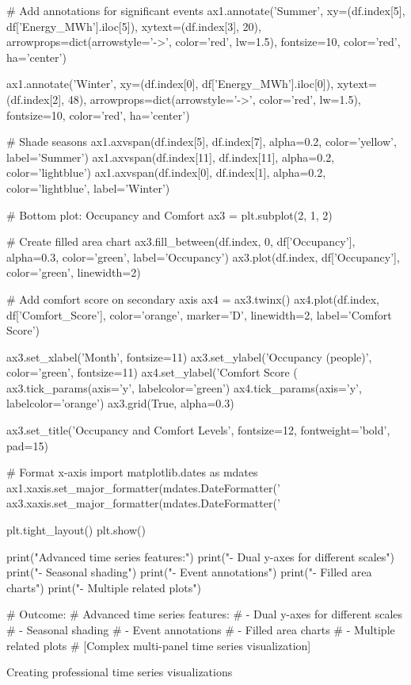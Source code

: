 {    # Add annotations for significant events
    ax1.annotate('Summer\nMinimum', 
                xy=(df.index[5], df['Energy_MWh'].iloc[5]),
                xytext=(df.index[3], 20),
                arrowprops=dict(arrowstyle='->', color='red', lw=1.5),
                fontsize=10, color='red', ha='center')
    
    ax1.annotate('Winter\nPeak', 
                xy=(df.index[0], df['Energy_MWh'].iloc[0]),
                xytext=(df.index[2], 48),
                arrowprops=dict(arrowstyle='->', color='red', lw=1.5),
                fontsize=10, color='red', ha='center')
    
    # Shade seasons
    ax1.axvspan(df.index[5], df.index[7], alpha=0.2, color='yellow', label='Summer')
    ax1.axvspan(df.index[11], df.index[11], alpha=0.2, color='lightblue')
    ax1.axvspan(df.index[0], df.index[1], alpha=0.2, color='lightblue', label='Winter')
    
    # Bottom plot: Occupancy and Comfort
    ax3 = plt.subplot(2, 1, 2)
    
    # Create filled area chart
    ax3.fill_between(df.index, 0, df['Occupancy'], 
                    alpha=0.3, color='green', label='Occupancy')
    ax3.plot(df.index, df['Occupancy'], color='green', linewidth=2)
    
    # Add comfort score on secondary axis
    ax4 = ax3.twinx()
    ax4.plot(df.index, df['Comfort_Score'], color='orange', 
            marker='D', linewidth=2, label='Comfort Score')
    
    ax3.set_xlabel('Month', fontsize=11)
    ax3.set_ylabel('Occupancy (people)', color='green', fontsize=11)
    ax4.set_ylabel('Comfort Score (%
    ax3.tick_params(axis='y', labelcolor='green')
    ax4.tick_params(axis='y', labelcolor='orange')
    ax3.grid(True, alpha=0.3)
    
    ax3.set_title('Occupancy and Comfort Levels', 
                 fontsize=12, fontweight='bold', pad=15)
    
    # Format x-axis
    import matplotlib.dates as mdates
    ax1.xaxis.set_major_formatter(mdates.DateFormatter('%
    ax3.xaxis.set_major_formatter(mdates.DateFormatter('%
    
    plt.tight_layout()
    plt.show()
    
    print("Advanced time series features:")
    print("- Dual y-axes for different scales")
    print("- Seasonal shading")
    print("- Event annotations")
    print("- Filled area charts")
    print("- Multiple related plots")
    
    # Outcome:
    # Advanced time series features:
    # - Dual y-axes for different scales
    # - Seasonal shading
    # - Event annotations
    # - Filled area charts
    # - Multiple related plots
    # [Complex multi-panel time series visualization]
}{Creating professional time series visualizations}

